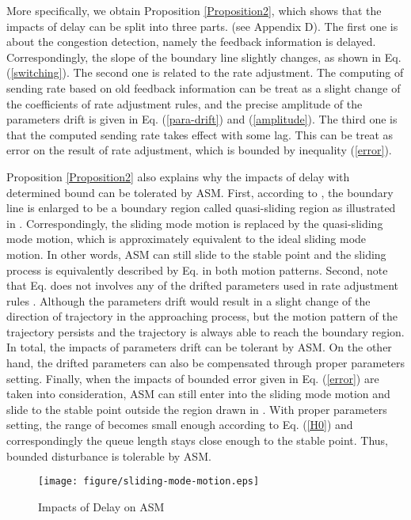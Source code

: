 \documentclass{sig-alternate-10pt}
\begin{document}
More specifically, we obtain Proposition \ref{Proposition2}, which shows that the impacts of delay can be split into three parts. (see Appendix D). The first one is about the congestion detection, namely the feedback information is delayed. Correspondingly, the slope of the boundary line  slightly changes, as shown in Eq. (\ref{switching}). The second one is related to the rate adjustment. The computing of sending rate based on old feedback information can be treat as a slight change of the coefficients of rate adjustment rules, and the precise amplitude of the parameters drift is given in Eq. (\ref{para-drift}) and (\ref{amplitude}). The third one is that the computed sending rate takes effect with some lag. This can be treat as error on the result of rate adjustment, which is bounded by inequality (\ref{error}).

Proposition \ref{Proposition2} also explains why the impacts of delay with determined bound can be tolerated by ASM. First, according to , the boundary line is enlarged to be a boundary region called quasi-sliding region as illustrated in . Correspondingly, the sliding mode motion is replaced by the quasi-sliding mode motion, which is approximately equivalent to the ideal sliding mode motion. In other words, ASM can still slide to the stable point and the sliding process is equivalently described by Eq.  in both motion patterns. Second, note that Eq.  does not involves any of the drifted parameters used in rate adjustment rules . Although the parameters drift would result in a slight change of the direction of trajectory in the approaching process, but the motion pattern of the trajectory persists and the trajectory is always able to reach the boundary region. In total, the impacts of parameters drift can be tolerant by ASM. On the other hand, the drifted parameters can also be compensated through proper parameters setting. Finally, when the impacts of bounded error  given in Eq. (\ref{error}) are taken into consideration, ASM can still enter into the sliding mode motion and slide to the stable point outside the region  drawn in . With proper parameters setting, the range of  becomes small enough according to Eq. (\ref{H0}) and correspondingly the queue length stays close enough to the stable point. Thus, bounded disturbance  is tolerable by ASM. 

\begin{figure}
\centering 
\texttt{[image: figure/sliding-mode-motion.eps]}
\caption{Impacts of Delay on ASM}
\label{smm}
\end{figure}
\end{document}

